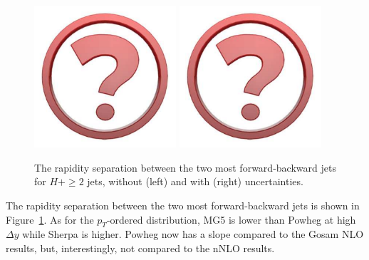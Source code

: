 \begin{figure}[t!]
  \centering
  \includegraphics[width=0.47\textwidth]{Micon.pdf}
  \hfill
  \includegraphics[width=0.47\textwidth]{Micon.pdf}
  \caption{
    The rapidity separation between the two most forward-backward jets
    for $H+\ge2$ jets, without (left) and with (right) uncertainties. 
    \label{fig:higgscomp:results:2obs:dyjj_fb}
  }
\end{figure}

The rapidity separation between the two most forward-backward jets is
shown in Figure~\ref{fig:higgscomp:results:2obs:dyjj_fb}. As for the
$p_T$-ordered distribution, MG5 is lower than Powheg at high $\Delta
y$ while Sherpa is higher. Powheg now has a slope compared to the
Gosam NLO results, but, interestingly, not compared to the nNLO
results.

